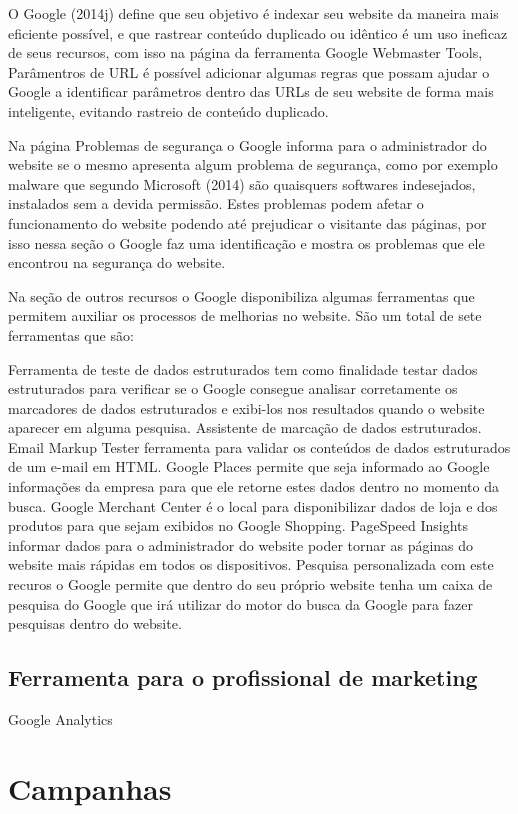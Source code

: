 \documentclass[
	12pt,				%
	openright,			%
	twoside,			%
	a4paper,			%
	english,			%
	french,				%
	spanish,			%
	brazil				%
	]{abntex2}
\begin{document}
O Google (2014j) define que seu objetivo é indexar seu website da maneira mais eficiente possível, e que rastrear conteúdo duplicado ou idêntico é um uso ineficaz de seus recursos, com isso na página da ferramenta Google Webmaster Tools, Parâmentros de URL é possível adicionar algumas regras que possam ajudar o Google a identificar parâmetros dentro das URLs de seu website de forma mais inteligente, evitando rastreio de conteúdo duplicado.

Na página Problemas de segurança o Google informa para o administrador do website se o mesmo apresenta algum problema de segurança, como por exemplo malware que segundo Microsoft (2014) são quaisquers softwares indesejados, instalados sem a devida permissão. Estes problemas podem afetar o funcionamento do website podendo até prejudicar o visitante das páginas, por isso nessa seção o Google faz uma identificação e mostra os problemas que ele encontrou na segurança do website.

Na seção de outros recursos o Google disponibiliza algumas ferramentas que permitem auxiliar os processos de melhorias no website. São um total de sete ferramentas que são: 

Ferramenta de teste de dados estruturados tem como finalidade testar dados estruturados para verificar se o Google consegue analisar corretamente os marcadores de dados estruturados e exibi-los nos resultados quando o website aparecer em alguma pesquisa.
Assistente de marcação de dados estruturados.
Email Markup Tester ferramenta para validar os conteúdos de dados estruturados de um e-mail em HTML.
Google Places permite que seja informado ao Google informações da empresa para que ele retorne estes dados dentro no momento da busca.
Google Merchant Center é o local para disponibilizar dados de loja e dos produtos para que sejam exibidos no Google Shopping.
PageSpeed Insights informar dados para o administrador do website poder tornar as páginas do website mais rápidas em todos os dispositivos.
Pesquisa personalizada com este recuros o Google permite que dentro do seu próprio website tenha um caixa de pesquisa do Google que irá utilizar do motor do busca da Google para fazer pesquisas dentro do website.

\subsection{Ferramenta para o profissional de marketing}

Google Analytics

\section{Campanhas}
\end{document}
